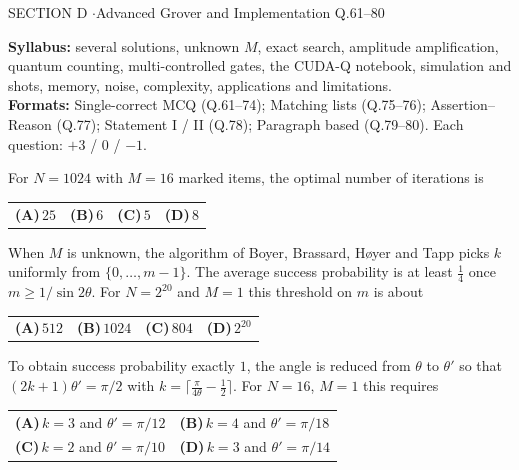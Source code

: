 \documentclass[11pt,a4paper]{article}
\newcommand{\optlabel}[1]{\textbf{(#1)}}
\newenvironment{qitem}[1]{\begin{list}{}{\setlength{\leftmargin}{3.3em}\setlength{\labelwidth}{3.1em}%
  \setlength{\labelsep}{0.2em}\setlength{\topsep}{3pt}\setlength{\parsep}{3pt}}\item[\textbf{Q.#1}\hfill]}{\end{list}}
\newcommand{\qsep}{\par\vspace{2pt}{\color{black!15}\hrule}\vspace{4pt}}
\begin{document}
\newpage

\begin{sectionbanner}SECTION D \enspace$\cdot$\enspace Advanced Grover and Implementation \hfill Q.61--80\end{sectionbanner}

{\small \textbf{Syllabus:} several solutions, unknown $M$, exact search, amplitude amplification, quantum counting, multi-controlled gates, the CUDA-Q notebook, simulation and shots, memory, noise, complexity, applications and limitations.\\ \textbf{Formats:} Single-correct MCQ (Q.61--74); Matching lists (Q.75--76); Assertion--Reason (Q.77); Statement I / II (Q.78); Paragraph based (Q.79--80). Each question: $+3$ / $0$ / $-1$.}
\par\medskip

\begin{qitem}{61}
For $N = 1024$ with $M = 16$ marked items, the optimal number of iterations is
\par\smallskip\noindent\begin{tabularx}{\linewidth}{@{}*{4}{L}@{}}
\optlabel{A}\,$25$ & \optlabel{B}\,$6$ & \optlabel{C}\,$5$ & \optlabel{D}\,$8$
\end{tabularx}
\end{qitem}
\qsep

\begin{qitem}{62}
When $M$ is unknown, the algorithm of Boyer, Brassard, H{\o}yer and Tapp picks $k$ uniformly from $\{0, \dots, m-1\}$. The average success probability is at least $\frac14$ once $m \ge 1/\sin2\theta$.
For $N = 2^{20}$ and $M = 1$ this threshold on $m$ is about
\par\smallskip\noindent\begin{tabularx}{\linewidth}{@{}*{4}{L}@{}}
\optlabel{A}\,$512$ & \optlabel{B}\,$1024$ & \optlabel{C}\,$804$ & \optlabel{D}\,$2^{20}$
\end{tabularx}
\end{qitem}
\qsep

\begin{qitem}{63}
To obtain success probability exactly $1$, the angle is reduced from $\theta$ to $\theta'$ so that $(2k+1)\theta' = \pi/2$ with $k = \lceil\frac{\pi}{4\theta} - \frac12\rceil$. For $N = 16$, $M = 1$ this requires
\par\smallskip\noindent\begin{tabularx}{\linewidth}{@{}*{2}{L}@{}}
\optlabel{A}\,$k = 3$ and $\theta' = \pi/12$ & \optlabel{B}\,$k = 4$ and $\theta' = \pi/18$ \\[3pt]
\optlabel{C}\,$k = 2$ and $\theta' = \pi/10$ & \optlabel{D}\,$k = 3$ and $\theta' = \pi/14$
\end{tabularx}
\end{qitem}
\qsep
\end{document}

